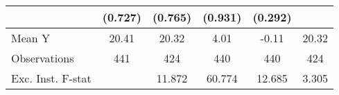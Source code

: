 {\begin{tabular}{l*{5}{c}}
            &     (0.727)         &     (0.765)         &     (0.931)         &     (0.292)         &                     \\
\midrule
Mean Y      &       20.41         &       20.32         &        4.01         &       -0.11         &       20.32         \\
Observations&         441         &         424         &         440         &         440         &         424         \\
Exc. Inst. F-stat&                     &      11.872         &      60.774         &      12.685         &       3.305         \\
\bottomrule
\end{tabular}
}
